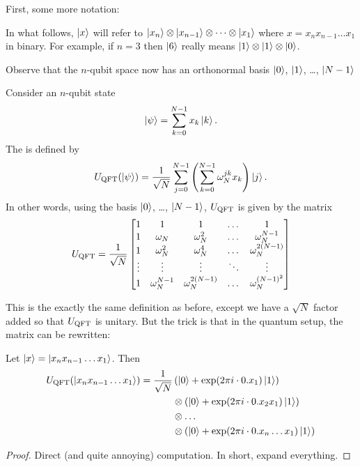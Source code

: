 First, some more notation:
\begin{abuse}
	In what follows, $\ket{x}$ will refer to
	$\ket{x_n} \otimes \ket{x_{n-1}} \otimes \dots \otimes \ket{x_1}$
	where $x = x_n x_{n-1} \dots x_1$ in binary.
	For example, if $n = 3$
	then $\ket{6}$ really means $\ket1 \otimes \ket1 \otimes \ket 0$.
\end{abuse}
Observe that the $n$-qubit space now has an
orthonormal basis $\ket0$, $\ket1$, \dots, $\ket{N-1}$

\begin{definition}
	Consider an $n$-qubit state
	\[ \ket\psi = \sum_{k=0}^{N-1} x_k \ket{k}. \]
	The  is defined by
	\[
		U_{\mathrm{QFT}}(\ket\psi) = \frac{1}{\sqrt N}\sum_{j=0}^{N-1}
		\left( \sum_{k=0}^{N-1} \omega_N^{jk} x_k \right) \ket{j}.
	\]
	In other words, using the basis $\ket0$, \dots, $\ket{N-1}$,
	$U_{\mathrm{QFT}}$ is given by the matrix
	\[
		U_{\mathrm{QFT}} = \frac{1}{\sqrt N}
		\begin{bmatrix}
			1 & 1 & 1 & \dots & 1 \\
			1 & \omega_N & \omega_N^2 & \dots & \omega_N^{N-1} \\
			1 & \omega_N^2 & \omega_N^4 & \dots & \omega_N^{2(N-1)} \\
			\vdots & \vdots & \vdots & \ddots & \vdots \\
			1 & \omega_N^{N-1} & \omega_N^{2(N-1)} & \dots & \omega_N^{(N-1)^2}
		\end{bmatrix}
	\]
\end{definition}
This is the exactly the same definition as before,
except we have a $\sqrt N$ factor added so that $U_{\mathrm{QFT}}$ is unitary.
But the trick is that in the quantum setup, the matrix can be rewritten:
\begin{proposition}
	Let $\ket x = \ket{x_n x_{n-1} \dots x_1}$.
	Then
	\begin{align*}
		U_{\mathrm{QFT}}( \ket{x_n x_{n-1} \dots x_1} )
		= \frac{1}{\sqrt N} &
		\left( \ket0 +\exp(2\pi i \cdot 0.x_1) \ket 1 \right) \\
		&\otimes \left( \ket0 +\exp(2\pi i \cdot 0.x_2x_1) \ket 1 \right) \\
		&\otimes \dots  \\
		&\otimes \left( \ket0 +\exp(2\pi i \cdot 0.x_n\dots x_1) \ket 1 \right)
	\end{align*}
\end{proposition}
\begin{proof}
	Direct (and quite annoying) computation.
	In short, expand everything.
\end{proof}

